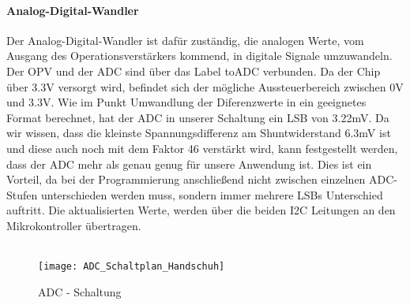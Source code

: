\documentclass[titlepage,12pt,twoside]{article}
\begin{document}
\paragraph{Analog-Digital-Wandler}
\hfill \break
\hfill \break
Der Analog-Digital-Wandler ist dafür zuständig, die analogen Werte, vom Ausgang des Operationsverstärkers kommend, in digitale 
Signale umzuwandeln. Der OPV und der ADC sind über das Label toADC verbunden. Da der Chip über 3.3V versorgt wird, befindet
sich der mögliche Aussteuerbereich zwischen 0V und 3.3V. Wie im Punkt Umwandlung der Diferenzwerte in ein geeignetes Format berechnet, 
hat der ADC in unserer Schaltung ein LSB von 3.22mV. Da wir wissen, dass die kleinste Spannungsdifferenz am Shuntwiderstand 6.3mV
ist und diese auch noch mit dem Faktor 46 verstärkt wird, kann festgestellt werden, dass der ADC mehr als genau genug für unsere
Anwendung ist. Dies ist ein Vorteil, da bei der Programmierung anschließend nicht zwischen einzelnen ADC-Stufen unterschieden werden
muss, sondern immer mehrere LSBs Unterschied auftritt. Die aktualisierten Werte, werden über die beiden I2C Leitungen an den 
Mikrokontroller übertragen. \\
\\
\begin{figure}[H]
	\begin{center}
		\scalebox{0.5}
		{\texttt{[image: ADC\_Schaltplan\_Handschuh]}}
		\caption{ADC - Schaltung}
		\label{fig:ADC_Schaltplan_Handschuh}	
	\end{center}
\end{figure}
\end{document}
